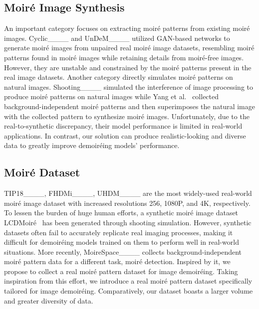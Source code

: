 \subsection{Moiré Image Synthesis}
An important category focuses on extracting moiré patterns from existing moiré images. Cyclic____ and UnDeM____ utilized GAN-based networks to generate moiré images from unpaired real moiré image datasets, resembling moiré patterns found in moiré images while retaining details from moiré-free images. However, they are unstable and constrained by the moiré patterns present in the real image datasets. 
Another category directly simulates moiré patterns on natural images. Shooting____ simulated the interference of image processing to produce moiré patterns on natural images while Yang et al.~ collected background-independent moiré patterns and then superimposes the natural image with the collected pattern to synthesize moiré images. 
Unfortunately, due to the real-to-synthetic discrepancy, their model performance is limited in real-world applications. 
In contrast, our solution can produce realistic-looking and diverse data to greatly improve demoiréing models' performance.

\subsection{Moiré Dataset} 
TIP18____, FHDMi____, UHDM____ are the most widely-used real-world moiré image dataset with increased resolutions 256, 1080P, and 4K, respectively. To lessen the burden of huge human efforts, a synthetic moiré image dataset LCDMoiré~ has been generated through shooting simulation.
However, synthetic datasets often fail to accurately replicate real imaging processes, making it difficult for demoiréing models trained on them to perform well in real-world situations.
More recently, MoireSpace____ collects background-independent moiré pattern data for a different task, moiré detection. Inspired by it, we propose to collect a real moiré pattern dataset for image demoiréing. Taking inspiration from this effort, we introduce a real moiré pattern dataset specifically tailored for image demoiréing. Comparatively, our dataset boasts a larger volume and greater diversity of data.


